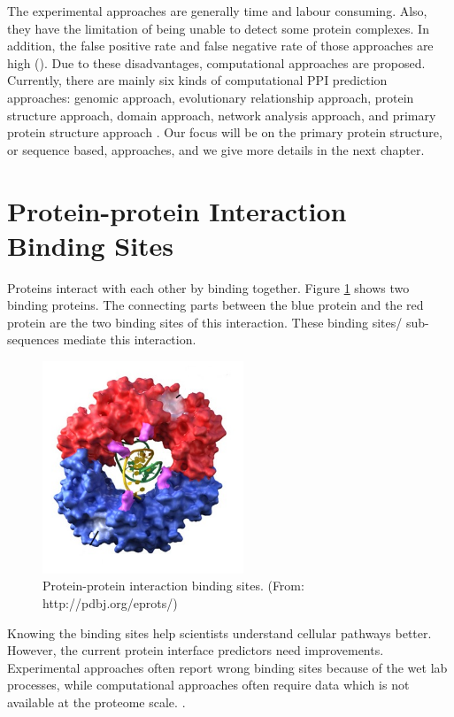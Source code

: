  The experimental approaches are generally time and labour consuming. Also, they have the limitation of being unable to detect some protein complexes. In addition, the false positive rate and false negative rate of those approaches are high (\cite{pitre2006pipe}). Due to these disadvantages, computational approaches are proposed. Currently, there are mainly six kinds of computational PPI prediction approaches: genomic approach, evolutionary relationship approach, protein structure approach, domain approach, network analysis approach, and primary protein structure approach \cite{jessulat2011recent}. Our focus will be on the primary protein structure, or sequence based, approaches, and we give more details in the next chapter.
 
\section{Protein-protein Interaction Binding Sites}
Proteins interact with each other by binding together. Figure \ref{fig:ppi_bind} shows two binding proteins. The connecting parts between the blue protein and the red protein are the two binding sites of this interaction. These binding sites/ sub-sequences mediate this interaction.
\begin{figure}[h!]
\begin{center}
\includegraphics[width=6cm]{img/binding_sites.jpg}
\end{center}
\caption{Protein-protein interaction binding sites. (From: http://pdbj.org/eprots/) \label{fig:ppi_bind}}
\end{figure}

Knowing the binding sites help scientists understand cellular pathways better. However, the current protein interface predictors need improvements. Experimental approaches often report wrong binding
sites because of the wet lab processes, while computational approaches often require data which is not available at the proteome scale. \cite{amos2011binding}.

